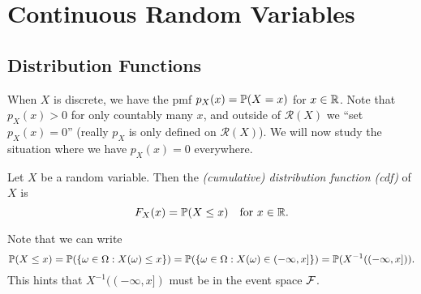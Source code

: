 \chapter{Continuous Random Variables}

\section{Distribution Functions}
\begin{remark}
  When $X$ is discrete, we have the pmf
  $p_X(x) = \mathbb{P}(X = x)$ for $x \in \mathbb{R}$. Note that
  $p_X(x) > 0$ for only countably many $x$, and
  outside of $\mathcal{R}(X)$ we ``set $p_X(x) = 0$''
  (really $p_X$ is only defined on $\mathcal{R}(X)$).
  We will now study the situation where we
  have $p_X(x) = 0$ everywhere.
\end{remark}

\begin{definition}
  Let $X$ be a random variable. Then the
  \emph{(cumulative) distribution function (cdf)}
  of $X$ is
  \[
    F_X(x) = \mathbb{P}(X \le x) \quad \text{for } x \in \mathbb{R}.
  \]
\end{definition}

\begin{remark}
  Note that we can write
  \[
    \mathbb{P}(X \le x)
    = \mathbb{P}(\{\omega \in \Omega : X(\omega) \le x\})
    = \mathbb{P}(\{\omega \in \Omega : X(\omega) \in (-\infty, x]\})
    = \mathbb{P}(X^{-1}((-\infty, x])).
  \]
  This hints that $X^{-1}((-\infty, x])$ must be in
  the event space $\mathcal{F}$.
\end{remark}

